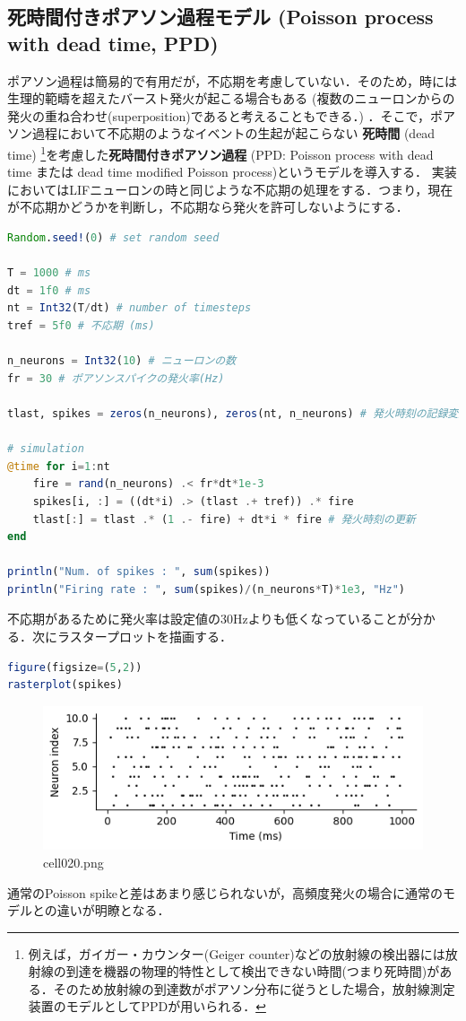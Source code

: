 \subsection{死時間付きポアソン過程モデル (Poisson process with dead time, PPD)}
ポアソン過程は簡易的で有用だが，不応期を考慮していない．そのため，時には生理的範疇を超えたバースト発火が起こる場合もある (複数のニューロンからの発火の重ね合わせ(superposition)であると考えることもできる．) ．そこで，ポアソン過程において不応期のようなイベントの生起が起こらない \textbf{死時間} (dead time) \footnote{例えば，ガイガー・カウンター(Geiger counter)などの放射線の検出器には放射線の到達を機器の物理的特性として検出できない時間(つまり死時間)がある．そのため放射線の到達数がポアソン分布に従うとした場合，放射線測定装置のモデルとしてPPDが用いられる．}を考慮した\textbf{死時間付きポアソン過程} (PPD: Poisson process with dead time または dead time modified Poisson process)というモデルを導入する．
実装においてはLIFニューロンの時と同じような不応期の処理をする．つまり，現在が不応期かどうかを判断し，不応期なら発火を許可しないようにする．
\begin{lstlisting}[language=julia]
Random.seed!(0) # set random seed

T = 1000 # ms
dt = 1f0 # ms
nt = Int32(T/dt) # number of timesteps
tref = 5f0 # 不応期 (ms)

n_neurons = Int32(10) # ニューロンの数
fr = 30 # ポアソンスパイクの発火率(Hz)

tlast, spikes = zeros(n_neurons), zeros(nt, n_neurons) # 発火時刻の記録変数

# simulation
@time for i=1:nt
    fire = rand(n_neurons) .< fr*dt*1e-3
    spikes[i, :] = ((dt*i) .> (tlast .+ tref)) .* fire
    tlast[:] = tlast .* (1 .- fire) + dt*i * fire # 発火時刻の更新
end

println("Num. of spikes : ", sum(spikes))
println("Firing rate : ", sum(spikes)/(n_neurons*T)*1e3, "Hz")
\end{lstlisting}
不応期があるために発火率は設定値の30Hzよりも低くなっていることが分かる．次にラスタープロットを描画する．
\begin{lstlisting}[language=julia]
figure(figsize=(5,2))
rasterplot(spikes)
\end{lstlisting}
\begin{figure}[ht]
	\centering
	\includegraphics[scale=0.8, max width=\linewidth]{./fig/neuron-model/isi/cell020.png}
	\caption{cell020.png}
	\label{cell020.png}
\end{figure}
通常のPoisson spikeと差はあまり感じられないが，高頻度発火の場合に通常のモデルとの違いが明瞭となる．
